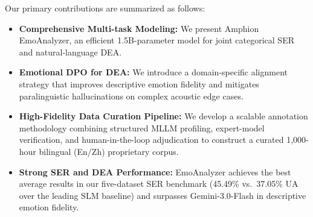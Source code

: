 Our primary contributions are summarized as follows:
\begin{itemize}
    \item \textbf{Comprehensive Multi-task Modeling:} We present Amphion EmoAnalyzer, an efficient 1.5B-parameter model for joint categorical SER and natural-language DEA.
    \item \textbf{Emotional DPO for DEA:} We introduce a domain-specific alignment strategy that improves descriptive emotion fidelity and mitigates paralinguistic hallucinations on complex acoustic edge cases.
    \item \textbf{High-Fidelity Data Curation Pipeline:} We develop a scalable annotation methodology combining structured MLLM profiling, expert-model verification, and human-in-the-loop adjudication to construct a curated 1,000-hour bilingual (En/Zh) proprietary corpus.
    \item \textbf{Strong SER and DEA Performance:} EmoAnalyzer achieves the best average results in our five-dataset SER benchmark (45.49\% vs.\ 37.05\% UA over the leading SLM baseline) and surpasses Gemini-3.0-Flash in descriptive emotion fidelity.
\end{itemize}


